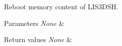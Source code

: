 Reboot memory content of L\-I\-S3\-D\-S\-H. 


\begin{DoxyParams}{Parameters}
{\em None} & \\
\hline
\end{DoxyParams}

\begin{DoxyRetVals}{Return values}
{\em None} & \\
\hline
\end{DoxyRetVals}
